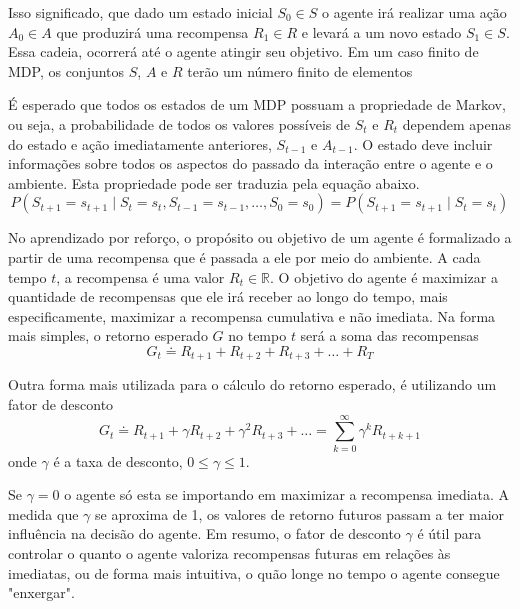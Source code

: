 Isso significado, que dado um estado inicial \(S_0 \in S\) 
o agente irá realizar uma ação \(A_0 \in A\) 
que produzirá uma recompensa \(R_1 \in R\) 
e levará a um novo estado \(S_1 \in S\). Essa cadeia, ocorrerá
até o agente atingir seu objetivo. Em um caso finito de MDP, os conjuntos \(S\), \(A\) e \(R\) terão
um número finito de elementos

É esperado que todos os estados de um MDP possuam a propriedade de Markov, ou seja,
a probabilidade de todos os valores possíveis de \(S_t\) e \(R_t\) dependem apenas do
estado e ação imediatamente anteriores, \(S_{t-1}\) e \(A_{t-1}\). O estado deve incluir
informações sobre todos os aspectos do passado da interação entre o agente e o ambiente.
Esta propriedade pode ser traduzia pela equação abaixo.
\begin{equation}
    P(S_{t+1} = s_{t+1}\mid S_{t} = s_{t}, S_{t-1} = s_{t-1},\ldots, S_0 = s_0) = 
    P(S_{t+1} = s_{t+1}\mid S_{t} = s_{t})
\end{equation}


No aprendizado por reforço, o propósito ou objetivo de um agente é formalizado a partir
de uma recompensa que é passada a ele por meio do ambiente. A cada tempo \(t\), a recompensa
é uma valor \(R_{t} \in \mathbb{R}\). O objetivo do agente é maximizar a quantidade de
recompensas que ele irá receber ao longo do tempo, mais especificamente, maximizar a 
recompensa cumulativa e não imediata. Na forma mais simples, o retorno esperado \(G\) no 
tempo \(t\) será a soma das recompensas
\begin{equation}
    G_{t} \doteq R_{t+1} + R_{t+2} + R_{t+3} + \ldots + R_{T}
\end{equation}

Outra forma mais utilizada para o cálculo do retorno esperado, é utilizando um fator
de desconto
\begin{equation}
    G_{t} \doteq  R_{t+1} + \gamma R_{t+2} + \gamma^2 R_{t+3} + \ldots =
    \sum_{k=0}^{\infty}\gamma^k R_{t+k+1}
\end{equation}
\noindent onde \(\gamma\) é a taxa de desconto, \(0 \leq \gamma \leq 1\).

Se \(\gamma = 0 \) o agente só esta se importando em maximizar a recompensa imediata.
A medida que \(\gamma\) se aproxima de 1, os valores de retorno futuros 
passam a ter maior influência na decisão do agente. 
Em resumo, o fator de desconto \(\gamma\) é útil para controlar o quanto o agente 
valoriza recompensas futuras em relações às imediatas, ou de forma mais intuitiva,
o quão longe no tempo o agente consegue "enxergar".

